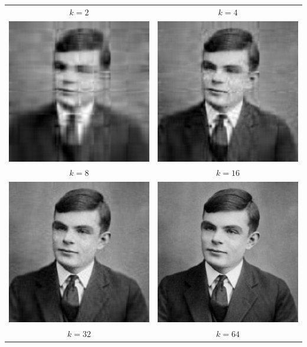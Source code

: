 \documentclass[11pt,letter,notitlepage]{article}
\begin{document}
\begin{solution}
\begin{enumerate}
\begin{center}
\begin{tabular}{cc}
                      $k=2$   & $k=4$                                                                          \\
                      \includegraphics[width=0.3\columnwidth]{solution7.4_img/Alan_Turing_k=8.pdf}
                              & \includegraphics[width=0.3\columnwidth]{solution7.4_img/Alan_Turing_k=16.pdf}  \\
                      $k=8$   & $k=16$                                                                         \\
                      \includegraphics[width=0.3\columnwidth]{solution7.4_img/Alan_Turing_k=32.pdf}
                              & \includegraphics[width=0.3\columnwidth]{solution7.4_img/Alan_Turing_k=64.pdf}  \\
                      $k=32$  & $k=64$                                                                         \\

\end{tabular}
\end{center}
\end{enumerate}
\end{solution}
\end{document}
